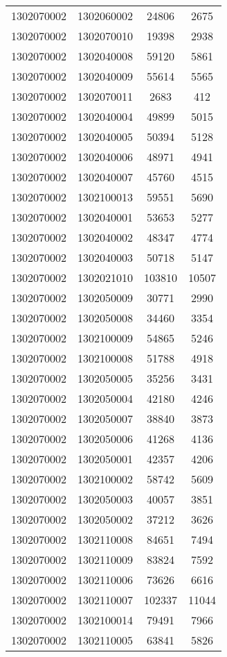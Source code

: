 \begin{longtable}[h]{llcc}
		1302070002 & 1302060002 & 24806 & 2675\\
		1302070002 & 1302070010 & 19398 & 2938\\
		1302070002 & 1302040008 & 59120 & 5861\\
		1302070002 & 1302040009 & 55614 & 5565\\
		1302070002 & 1302070011 & 2683 & 412\\
		1302070002 & 1302040004 & 49899 & 5015\\
		1302070002 & 1302040005 & 50394 & 5128\\
		1302070002 & 1302040006 & 48971 & 4941\\
		1302070002 & 1302040007 & 45760 & 4515\\
		1302070002 & 1302100013 & 59551 & 5690\\
		1302070002 & 1302040001 & 53653 & 5277\\
		1302070002 & 1302040002 & 48347 & 4774\\
		1302070002 & 1302040003 & 50718 & 5147\\
		1302070002 & 1302021010 & 103810 & 10507\\
		1302070002 & 1302050009 & 30771 & 2990\\
		1302070002 & 1302050008 & 34460 & 3354\\
		1302070002 & 1302100009 & 54865 & 5246\\
		1302070002 & 1302100008 & 51788 & 4918\\
		1302070002 & 1302050005 & 35256 & 3431\\
		1302070002 & 1302050004 & 42180 & 4246\\
		1302070002 & 1302050007 & 38840 & 3873\\
		1302070002 & 1302050006 & 41268 & 4136\\
		1302070002 & 1302050001 & 42357 & 4206\\
		1302070002 & 1302100002 & 58742 & 5609\\
		1302070002 & 1302050003 & 40057 & 3851\\
		1302070002 & 1302050002 & 37212 & 3626\\
		1302070002 & 1302110008 & 84651 & 7494\\
		1302070002 & 1302110009 & 83824 & 7592\\
		1302070002 & 1302110006 & 73626 & 6616\\
		1302070002 & 1302110007 & 102337 & 11044\\
		1302070002 & 1302100014 & 79491 & 7966\\
		1302070002 & 1302110005 & 63841 & 5826\\

\end{longtable}
